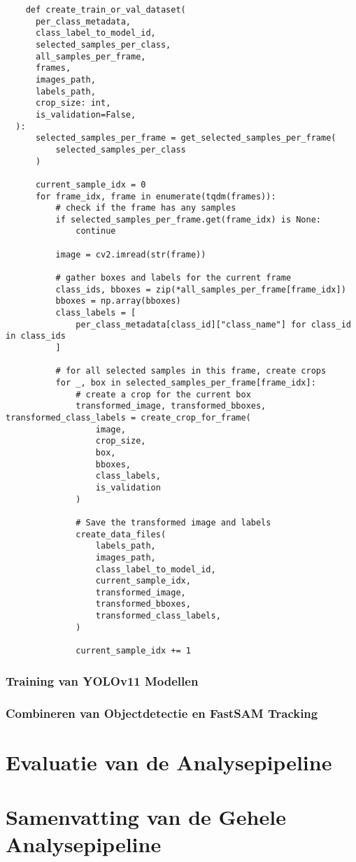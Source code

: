 \begin{listing}[H]
  \fontsize{10pt}{9.6pt}
  \begin{verbatim}
    def create_train_or_val_dataset(
      per_class_metadata,
      class_label_to_model_id,
      selected_samples_per_class,
      all_samples_per_frame,
      frames,
      images_path,
      labels_path,
      crop_size: int,
      is_validation=False,
  ):
      selected_samples_per_frame = get_selected_samples_per_frame(
          selected_samples_per_class
      )

      current_sample_idx = 0
      for frame_idx, frame in enumerate(tqdm(frames)):
          # check if the frame has any samples
          if selected_samples_per_frame.get(frame_idx) is None:
              continue

          image = cv2.imread(str(frame))

          # gather boxes and labels for the current frame
          class_ids, bboxes = zip(*all_samples_per_frame[frame_idx])
          bboxes = np.array(bboxes)
          class_labels = [
              per_class_metadata[class_id]["class_name"] for class_id in class_ids
          ]

          # for all selected samples in this frame, create crops
          for _, box in selected_samples_per_frame[frame_idx]:
              # create a crop for the current box
              transformed_image, transformed_bboxes, transformed_class_labels = create_crop_for_frame(
                  image,
                  crop_size,
                  box,
                  bboxes,
                  class_labels,
                  is_validation
              )

              # Save the transformed image and labels
              create_data_files(
                  labels_path,
                  images_path,
                  class_label_to_model_id,
                  current_sample_idx,
                  transformed_image,
                  transformed_bboxes,
                  transformed_class_labels,
              )

              current_sample_idx += 1
  \end{verbatim}
  \caption[Functie voor het creëren van de trainings- en validatiedatasets]{
    \label{listing:create-train-val-dataset}
    }
\end{listing}




\subsubsection{Training van YOLOv11 Modellen}

\subsubsection{Combineren van Objectdetectie en FastSAM Tracking}

\section{Evaluatie van de Analysepipeline}

\section{Samenvatting van de Gehele Analysepipeline}